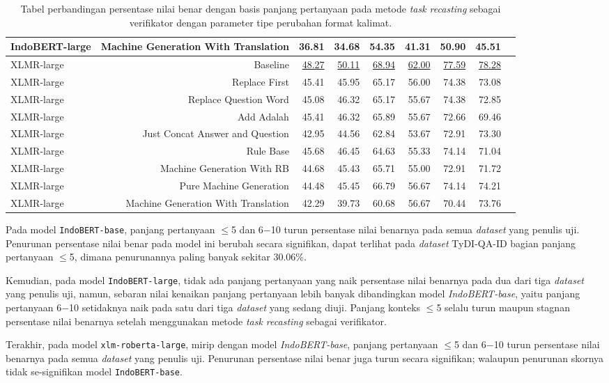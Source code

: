 \begin{table}[H]
\begin{tabular}{lrrrrrrrr}
IndoBERT-large &Machine Generation With Translation &36.81 &34.68 &54.35 &41.31 &50.90 &45.51 \\
\hline
XLMR-large &Baseline &\underline{48.27} &\underline{50.11} &\underline{68.94} &\underline{62.00} &\underline{77.59} &\underline{78.28} \\
XLMR-large &Replace First &45.41 &45.95 &65.17 &56.00 &74.38 &73.08 \\
XLMR-large &Replace Question Word &45.08 &46.32 &65.17 &55.67 &74.38 &72.85 \\
XLMR-large &Add Adalah &45.41 &46.32 &65.89 &55.67 &72.66 &69.46 \\
XLMR-large &Just Concat Answer and Question &42.95 &44.56 &62.84 &53.67 &72.91 &73.30 \\
XLMR-large &Rule Base &45.68 &46.45 &64.63 &55.33 &74.14 &71.04 \\
XLMR-large &Machine Generation With RB &44.68 &45.43 &65.71 &55.00 &72.91 &71.72 \\
XLMR-large &Pure Machine Generation &44.48 &45.45 &66.79 &56.67 &74.14 &74.21 \\
XLMR-large &Machine Generation With Translation &42.29 &39.73 &60.68 &56.67 &70.44 &73.76 \\
\bottomrule
\end{tabular}
\caption{Tabel perbandingan persentase nilai benar dengan basis panjang pertanyaan pada metode \emph{task recasting} sebagai verifikator dengan parameter tipe perubahan format kalimat.}
\end{table}

Pada model \texttt{IndoBERT-base}, panjang pertanyaan $\leq$5 dan 6$-$10 turun persentase nilai benarnya pada semua \emph{dataset} yang penulis uji. Penurunan persentase nilai benar pada model ini berubah secara signifikan, dapat terlihat pada \emph{dataset} TyDI-QA-ID bagian panjang pertanyaan $\leq$5, dimana penurunannya paling banyak sekitar 30.06\%.

Kemudian, pada model \texttt{IndoBERT-large}, tidak ada panjang pertanyaan yang naik persentase nilai benarnya pada dua dari tiga \emph{dataset} yang penulis uji, namun, sebaran nilai kenaikan panjang pertanyaan lebih banyak dibandingkan model \emph{IndoBERT-base}, yaitu panjang pertanyaan 6$-$10 setidaknya naik pada satu dari tiga \emph{dataset} yang sedang diuji. Panjang konteks  $\leq$5 selalu turun maupun stagnan persentase nilai benarnya setelah menggunakan metode \emph{task recasting} sebagai verifikator.

Terakhir, pada model \texttt{xlm-roberta-large}, mirip dengan model \emph{IndoBERT-base}, panjang pertanyaan $\leq$5 dan 6$-$10 turun persentase nilai benarnya pada semua \emph{dataset} yang penulis uji. Penurunan persentase nilai benar juga turun secara signifikan; walaupun penurunan skornya tidak se-signifikan model \texttt{IndoBERT-base}.

